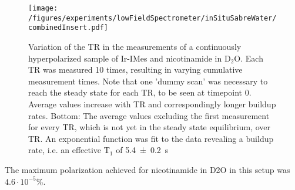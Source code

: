         \begin{figure}
            \texttt{[image: /figures/experiments/lowFieldSpectrometer/inSituSabreWater/combinedInsert.pdf]}
            \caption[TR variation]{Variation of the TR in the measurements of a continuously hyperpolarized sample of Ir-IMes and nicotinamide in D$_2$O. Each TR was measured 10 times, resulting in varying cumulative measurement times. Note that one 'dummy scan' was necessary to reach the steady state for each TR, to be seen at timepoint 0. Average values increase with TR and correspondingly longer buildup rates. Bottom: The average values excluding the first measurement for every TR, which is not yet in the steady state equilibrium, over TR. An exponential function was fit to the data revealing a buildup rate, i.e. an effective T$_1$ of \SI{5.4\pm 0.2}{\second}}
            \label{fig:results:lowFieldSpectrometer:TRvariation}
        \end{figure}
        The maximum polarization achieved for nicotinamide in D2O in this setup was $4.6\cdot 10^{-5}\si{\percent}$.
